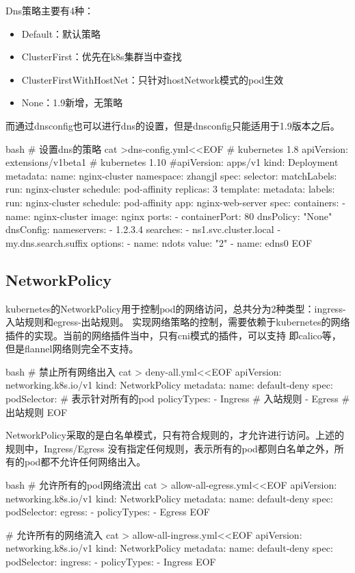 Dns策略主要有4种：
\begin{itemize}
    \item Default：默认策略
    \item ClusterFirst：优先在k8s集群当中查找
    \item ClusterFirstWithHostNet：只针对hostNetwork模式的pod生效
    \item None：1.9新增，无策略
\end{itemize}

而通过dnsconfig也可以进行dns的设置，但是dnsconfig只能适用于1.9版本之后。
\begin{code-block}{bash}
# 设置dns的策略
cat >dns-config.yml<<EOF
# kubernetes 1.8
apiVersion: extensions/v1beta1
# kubernetes 1.10
#apiVersion: apps/v1
kind: Deployment
metadata:
  name: nginx-cluster
  namespace: zhangjl
spec:
  selector:
    matchLabels:
      run: nginx-cluster
      schedule: pod-affinity
  replicas: 3
  template:
    metadata:
      labels:
        run: nginx-cluster
        schedule: pod-affinity
        app: nginx-web-server
    spec:
      containers:
      - name: nginx-cluster
        image: nginx
        ports:
        - containerPort: 80
      dnsPolicy: "None"
      dnsConfig:
        nameservers:
          - 1.2.3.4
        searches:
          - ns1.svc.cluster.local
          - my.dns.search.suffix
        options:
          - name: ndots
            value: "2"
          - name: edns0
EOF
\end{code-block}

\subsection{NetworkPolicy}
kubernetes的NetworkPolicy用于控制pod的网络访问，总共分为2种类型：ingress-入站规则和egress-出站规则。
实现网络策略的控制，需要依赖于kubernetes的网络插件的实现。当前的网络插件当中，只有cni模式的插件，可以支持
即calico等，但是flannel网络则完全不支持。
\begin{code-block}{bash}
# 禁止所有网络出入
cat > deny-all.yml<<EOF
apiVersion: networking.k8s.io/v1
kind: NetworkPolicy
metadata:
  name: default-deny
spec:
  podSelector: {}  # 表示针对所有的pod
  policyTypes:
  - Ingress        # 入站规则
  - Egress         # 出站规则
EOF
\end{code-block}
NetworkPolicy采取的是白名单模式，只有符合规则的，才允许进行访问。上述的规则中，Ingress/Egress
没有指定任何规则，表示所有的pod都则白名单之外，所有的pod都不允许任何网络出入。

\begin{code-block}{bash}
# 允许所有的pod网络流出
cat > allow-all-egress.yml<<EOF
apiVersion: networking.k8s.io/v1
kind: NetworkPolicy
metadata:
  name: default-deny
spec:
  podSelector: {}
  egress:
  - {}
  policyTypes:
  - Egress
EOF

# 允许所有的网络流入
cat > allow-all-ingress.yml<<EOF
apiVersion: networking.k8s.io/v1
kind: NetworkPolicy
metadata:
  name: default-deny
spec:
  podSelector: {}
  ingress:
  - {}
  policyTypes:
  - Ingress
EOF
\end{code-block}

